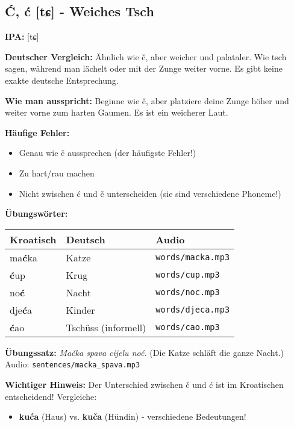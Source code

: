 \subsection{Ć, ć [tɕ] - \glqq Weiches Tsch\grqq{}}

\begin{tcolorbox}[colback=lightblue!30, colframe=croatianblue, title=\textbf{Ć, ć}]

\textbf{IPA:} [tɕ]

\textbf{Deutscher Vergleich:}
Ähnlich wie \glqq č\grqq{}, aber weicher und palataler. Wie \glqq tsch\grqq{} sagen, während man lächelt oder mit der Zunge weiter vorne. Es gibt keine exakte deutsche Entsprechung.

\textbf{Wie man ausspricht:}
Beginne wie \glqq č\grqq{}, aber platziere deine Zunge höher und weiter vorne zum harten Gaumen. Es ist ein \glqq weicherer\grqq{} Laut.

\textbf{Häufige Fehler:}
\begin{itemize}
    \item Genau wie \glqq č\grqq{} aussprechen (der häufigste Fehler!)
    \item Zu hart/rau machen
    \item Nicht zwischen \glqq ć\grqq{} und \glqq č\grqq{} unterscheiden (sie sind verschiedene Phoneme!)
\end{itemize}

\textbf{Übungswörter:}
\begin{tabular}{lll}
\textbf{Kroatisch} & \textbf{Deutsch} & \textbf{Audio} \\
\midrule
ma\textbf{ć}ka & Katze & \texttt{words/macka.mp3} \\
\textbf{ć}up & Krug & \texttt{words/cup.mp3} \\
no\textbf{ć} & Nacht & \texttt{words/noc.mp3} \\
dje\textbf{ć}a & Kinder & \texttt{words/djeca.mp3} \\
\textbf{ć}ao & Tschüss (informell) & \texttt{words/cao.mp3} \\
\end{tabular}

\textbf{Übungssatz:}
\textit{Mačka spava cijelu noć.}
(Die Katze schläft die ganze Nacht.)
Audio: \texttt{sentences/macka\_spava.mp3}

\textbf{Wichtiger Hinweis:}
Der Unterschied zwischen \glqq č\grqq{} und \glqq ć\grqq{} ist im Kroatischen entscheidend! Vergleiche:
\begin{itemize}
    \item \textbf{kuća} (Haus) vs. \textbf{kuča} (Hündin) - verschiedene Bedeutungen!
\end{itemize}

\end{tcolorbox}

